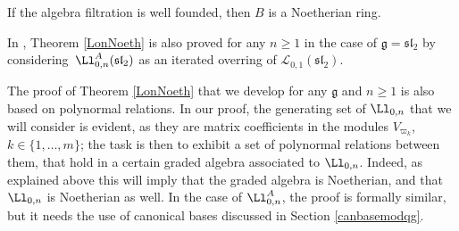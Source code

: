 \begin{teo} If the algebra filtration is well founded, then $B$ is a Noetherian ring.
\end{teo}

In \cite{DomLen}, Theorem \ref{LonNoeth} is also proved for any $n\geq 1$ in the case of $\mathfrak{g}={\mathfrak{sl}_2}$ by considering~$\Ll_{0,n}^A({\mathfrak{sl}_2})$ as an iterated overring of ${\mathcal L}_{0,1}({\mathfrak{sl}_2})$.


The proof of Theorem \ref{LonNoeth} that we develop for any $\mathfrak{g}$ and $n\geq 1$ is also based on polynormal relations. In our proof, the generating set of $\Ll_{0,n}$ that we will consider is evident, as they are matrix coefficients in the modules $V_{\varpi_k}$, $k\in\{1,\dots,m\}$; the task is then to exhibit a set of polynormal relations between them, that hold in a certain graded algebra associated to $\Ll_{0,n}$. Indeed, as explained above this will imply that the graded algebra is Noetherian, and that $\Ll_{0,n}$ is Noetherian as well. In the case of $\Ll_{0,n}^A$, the proof is formally similar, but it needs the use of canonical bases discussed in Section \ref{canbasemodqg}.

